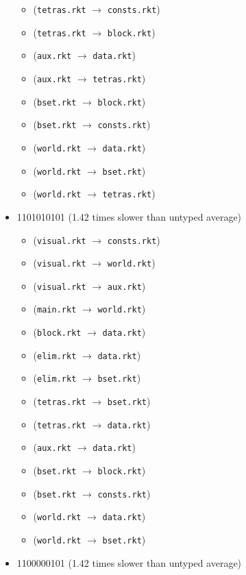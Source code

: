 \documentclass{article}
\newcommand{\mono}[1]{\texttt{#1}}
\begin{document}
\begin{itemize}
\begin{itemize}
  \item (\mono{tetras.rkt} $\rightarrow$ \mono{consts.rkt})
  \item (\mono{tetras.rkt} $\rightarrow$ \mono{block.rkt})
  \item (\mono{aux.rkt} $\rightarrow$ \mono{data.rkt})
  \item (\mono{aux.rkt} $\rightarrow$ \mono{tetras.rkt})
  \item (\mono{bset.rkt} $\rightarrow$ \mono{block.rkt})
  \item (\mono{bset.rkt} $\rightarrow$ \mono{consts.rkt})
  \item (\mono{world.rkt} $\rightarrow$ \mono{data.rkt})
  \item (\mono{world.rkt} $\rightarrow$ \mono{bset.rkt})
  \item (\mono{world.rkt} $\rightarrow$ \mono{tetras.rkt})
  \end{itemize}
\item 1101010101 (1.42 times slower than untyped average)
  \begin{itemize}
  \item (\mono{visual.rkt} $\rightarrow$ \mono{consts.rkt})
  \item (\mono{visual.rkt} $\rightarrow$ \mono{world.rkt})
  \item (\mono{visual.rkt} $\rightarrow$ \mono{aux.rkt})
  \item (\mono{main.rkt} $\rightarrow$ \mono{world.rkt})
  \item (\mono{block.rkt} $\rightarrow$ \mono{data.rkt})
  \item (\mono{elim.rkt} $\rightarrow$ \mono{data.rkt})
  \item (\mono{elim.rkt} $\rightarrow$ \mono{bset.rkt})
  \item (\mono{tetras.rkt} $\rightarrow$ \mono{bset.rkt})
  \item (\mono{tetras.rkt} $\rightarrow$ \mono{data.rkt})
  \item (\mono{aux.rkt} $\rightarrow$ \mono{data.rkt})
  \item (\mono{bset.rkt} $\rightarrow$ \mono{block.rkt})
  \item (\mono{bset.rkt} $\rightarrow$ \mono{consts.rkt})
  \item (\mono{world.rkt} $\rightarrow$ \mono{data.rkt})
  \item (\mono{world.rkt} $\rightarrow$ \mono{bset.rkt})
  \end{itemize}
\item 1100000101 (1.42 times slower than untyped average)

\end{itemize}
\end{document}
